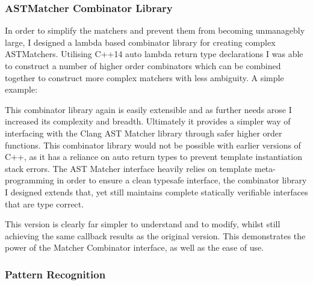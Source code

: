 \subsubsection{ASTMatcher Combinator Library}
In order to simplify the matchers and prevent them from becoming unmanagebly large, I designed a
lambda based combinator library for creating complex ASTMatchers. Utilising C++14 auto lambda return type
declarations I was able to construct a number of higher order combinators which can be combined
together to construct more complex matchers with less ambiguity. A simple example:

This combinator library again is easily extensible and as further needs arose I increased its
complexity and breadth. Ultimately it provides a simpler way of interfacing with the Clang AST
Matcher library through safer higher order functions.
This combinator library would not be possible with earlier versions of C++, as it has a reliance on
auto return types to prevent template instantiation stack errors. The AST Matcher interface heavily
relies on template meta-programming in order to ensure a clean typesafe interface, the combinator
library I designed extends that, yet still maintains complete statically verifiable interfaces that
are type correct.

This version is clearly far simpler to understand and to modify, whilst still achieving the same
callback results as the original version. This demonstrates the power of the Matcher Combinator
interface, as well as the ease of use.

\subsubsection{Pattern Recognition}
